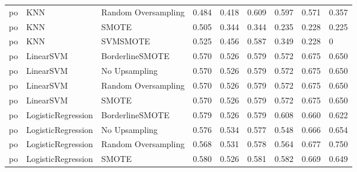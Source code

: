 \begin{tabular}{lllllllll}
      po &                          KNN & Random Oversampling & 0.484 &                     0.418 &                 0.609 &                  0.597 &                                   0.571 &     0.357 \\
      po &                          KNN &               SMOTE & 0.505 &                     0.344 &                 0.344 &                  0.235 &                                   0.228 &     0.225 \\
      po &                          KNN &            SVMSMOTE & 0.525 &                     0.456 &                 0.587 &                  0.349 &                                   0.228 &         0 \\
      po &                    LinearSVM &     BorderlineSMOTE & 0.570 &                     0.526 &                 0.579 &                  0.572 &                                   0.675 &     0.650 \\
      po &                    LinearSVM &       No Upsampling & 0.570 &                     0.526 &                 0.579 &                  0.572 &                                   0.675 &     0.650 \\
      po &                    LinearSVM & Random Oversampling & 0.570 &                     0.526 &                 0.579 &                  0.572 &                                   0.675 &     0.650 \\
      po &                    LinearSVM &               SMOTE & 0.570 &                     0.526 &                 0.579 &                  0.572 &                                   0.675 &     0.650 \\
      po &           LogisticRegression &     BorderlineSMOTE & 0.579 &                     0.526 &                 0.579 &                  0.608 &                                   0.660 &     0.622 \\
      po &           LogisticRegression &       No Upsampling & 0.576 &                     0.534 &                 0.577 &                  0.548 &                                   0.666 &     0.654 \\
      po &           LogisticRegression & Random Oversampling & 0.568 &                     0.531 &                 0.578 &                  0.564 &                                   0.677 &     0.750 \\
      po &           LogisticRegression &               SMOTE & 0.580 &                     0.526 &                 0.581 &                  0.582 &                                   0.669 &     0.649 \\

\end{tabular}
